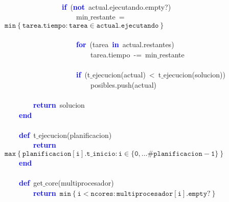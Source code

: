 \mbox{} \\
\mbox{}\ \ \ \ \ \ \ \ \ \ \ \ \ \ \ \ \textbf{\textcolor{Blue}{if}}\ \textcolor{BrickRed}{(}\textbf{\textcolor{Blue}{not}}\ actual\textcolor{BrickRed}{.}ejecutando\textcolor{BrickRed}{.}empty?\textcolor{BrickRed}{)} \\
\mbox{}\ \ \ \ \ \ \ \ \ \ \ \ \ \ \ \ \ \ \ \ min$\_$restante\ \textcolor{BrickRed}{=}\ $\mathtt{min\left\{tarea.tiempo: tarea \in actual.ejecutando\right\}}$ \\
\mbox{} \\
\mbox{}\ \ \ \ \ \ \ \ \ \ \ \ \ \ \ \ \ \ \ \ \textbf{\textcolor{Blue}{for}}\ \textcolor{BrickRed}{(}tarea\ \textbf{\textcolor{Blue}{in}}\ actual\textcolor{BrickRed}{.}restantes\textcolor{BrickRed}{)} \\
\mbox{}\ \ \ \ \ \ \ \ \ \ \ \ \ \ \ \ \ \ \ \ \ \ \ \ tarea\textcolor{BrickRed}{.}tiempo\ \textcolor{BrickRed}{-=}\ min$\_$restante \\
\mbox{} \\
\mbox{}\ \ \ \ \ \ \ \ \ \ \ \ \ \ \ \ \ \ \ \ \textbf{\textcolor{Blue}{if}}\ \textcolor{BrickRed}{(}t$\_$ejecucion\textcolor{BrickRed}{(}actual\textcolor{BrickRed}{)}\ \textcolor{BrickRed}{\textless{}}\ t$\_$ejecucion\textcolor{BrickRed}{(}solucion\textcolor{BrickRed}{)}\textcolor{BrickRed}{)} \\
\mbox{}\ \ \ \ \ \ \ \ \ \ \ \ \ \ \ \ \ \ \ \ \ \ \ \ 
posibles\textcolor{BrickRed}{.}push\textcolor{BrickRed}{(}actual\textcolor{BrickRed}{)} \\
\mbox{} \\
\mbox{}\ \ \ \ \ \ \ \ \textbf{\textcolor{Blue}{return}}\ solucion \\
\mbox{}\ \ \ \ \textbf{\textcolor{Blue}{end}} \\
\mbox{} \\
\mbox{}\ \ \ \ \textbf{\textcolor{Blue}{def}}\ t$\_$ejecucion\textcolor{BrickRed}{(}planificacion\textcolor{BrickRed}{)} \\
\mbox{}\ \ \ \ \ \ \ \ \textbf{\textcolor{Blue}{return}}\ $\mathtt{max\left\{ planificacion[i].t\_inicio : i \in \{0, \dots \#planificacion -1\} \right\}}$ \\
\mbox{}\ \ \ \ \textbf{\textcolor{Blue}{end}} \\
\mbox{} \\
\mbox{}\ \ \ \ \textbf{\textcolor{Blue}{def}}\ get$\_$core\textcolor{BrickRed}{(}multiprocesador\textcolor{BrickRed}{)} \\
\mbox{}\ \ \ \ \ \ \ \ \textbf{\textcolor{Blue}{return}}\ $\mathtt{min\left\{i < ncores : multiprocesador[i].empty? \right\}}$ \\
